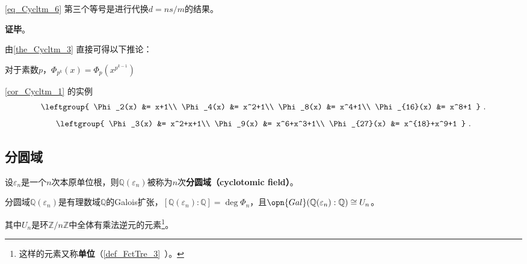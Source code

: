 \autoref{eq_Cycltm_6} 第三个等号是进行代换$d=ns/m$的结果。


\textbf{证毕}。








由\autoref{the_Cycltm_3} 直接可得以下推论：

\begin{corollary}{}\label{cor_Cycltm_1}
对于素数$p$，$\Phi_{p^k}(x) = \Phi_p(x^{p^{k-1}})$
\end{corollary}




\begin{example}{\autoref{cor_Cycltm_1}  的实例}
\begin{equation}
\leftgroup{
    \Phi_2(x) &= x+1\\
    \Phi_4(x) &= x^2+1\\
    \Phi_8(x) &= x^4+1\\
    \Phi_{16}(x) &= x^8+1
}~.
\end{equation}
\begin{equation}
\leftgroup{
    \Phi_3(x) &= x^2+x+1\\
    \Phi_9(x) &= x^6+x^3+1\\
    \Phi_{27}(x) &= x^{18}+x^9+1
}~.
\end{equation}
\end{example}




\subsection{分圆域}

\begin{definition}{}
设$\varepsilon_n$是一个$n$次本原单位根，则$\mathbb{Q}(\varepsilon_n)$被称为$n$次\textbf{分圆域（cyclotomic field）}。
\end{definition}


\begin{theorem}{}
分圆域$\mathbb{Q}(\varepsilon_n)$是有理数域$\mathbb{Q}$的Galois扩张，$[\mathbb{Q}(\varepsilon_n):\mathbb{Q}]=\deg \Phi_n$，且$\opn{Gal}(\mathbb{Q}(\varepsilon_n):\mathbb{Q})\cong U_n$。

其中$U_n$是环$\mathbb{Z}/n\mathbb{Z}$中全体有乘法逆元的元素\footnote{这样的元素又称\textbf{单位}（\autoref{def_FctTre_3}~）。}。
\end{theorem}


